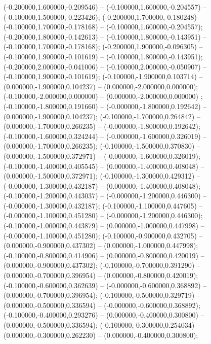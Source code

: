  (-0.200000,1.600000,-0.209546) -- (-0.100000,1.600000,-0.204557) -- (-0.100000,1.500000,-0.223426);
 (-0.200000,1.700000,-0.180248) -- (-0.100000,1.700000,-0.178168) -- (-0.100000,1.600000,-0.204557);
 (-0.200000,1.800000,-0.142613) -- (-0.100000,1.800000,-0.143951) -- (-0.100000,1.700000,-0.178168);
 (-0.200000,1.900000,-0.096305) -- (-0.100000,1.900000,-0.101619) -- (-0.100000,1.800000,-0.143951);
 (-0.200000,2.000000,-0.041006) -- (-0.100000,2.000000,-0.050907) -- (-0.100000,1.900000,-0.101619);
 (-0.100000,-1.900000,0.103714) -- (0.000000,-1.900000,0.104237) -- (0.000000,-2.000000,0.000000);
 (-0.100000,-2.000000,0.000000) -- (0.000000,-2.000000,0.000000) ;
 (-0.100000,-1.800000,0.191660) -- (-0.000000,-1.800000,0.192642) -- (0.000000,-1.900000,0.104237);
 (-0.100000,-1.700000,0.264842) -- (0.000000,-1.700000,0.266235) -- (-0.000000,-1.800000,0.192642);
 (-0.100000,-1.600000,0.324244) -- (-0.000000,-1.600000,0.326019) -- (0.000000,-1.700000,0.266235);
 (-0.100000,-1.500000,0.370830) -- (0.000000,-1.500000,0.372971) -- (-0.000000,-1.600000,0.326019);
 (-0.100000,-1.400000,0.405545) -- (0.000000,-1.400000,0.408048) -- (0.000000,-1.500000,0.372971);
 (-0.100000,-1.300000,0.429312) -- (-0.000000,-1.300000,0.432187) -- (0.000000,-1.400000,0.408048);
 (-0.100000,-1.200000,0.443037) -- (-0.000000,-1.200000,0.446300) -- (-0.000000,-1.300000,0.432187);
 (-0.100000,-1.100000,0.447605) -- (-0.000000,-1.100000,0.451280) -- (-0.000000,-1.200000,0.446300);
 (-0.100000,-1.000000,0.443879) -- (0.000000,-1.000000,0.447998) -- (-0.000000,-1.100000,0.451280);
 (-0.100000,-0.900000,0.432705) -- (0.000000,-0.900000,0.437302) -- (0.000000,-1.000000,0.447998);
 (-0.100000,-0.800000,0.414906) -- (0.000000,-0.800000,0.420019) -- (0.000000,-0.900000,0.437302);
 (-0.100000,-0.700000,0.391290) -- (0.000000,-0.700000,0.396954) -- (0.000000,-0.800000,0.420019);
 (-0.100000,-0.600000,0.362639) -- (-0.000000,-0.600000,0.368892) -- (0.000000,-0.700000,0.396954);
 (-0.100000,-0.500000,0.329719) -- (0.000000,-0.500000,0.336594) -- (-0.000000,-0.600000,0.368892);
 (-0.100000,-0.400000,0.293276) -- (0.000000,-0.400000,0.300800) -- (0.000000,-0.500000,0.336594);
 (-0.100000,-0.300000,0.254034) -- (0.000000,-0.300000,0.262230) -- (0.000000,-0.400000,0.300800);
